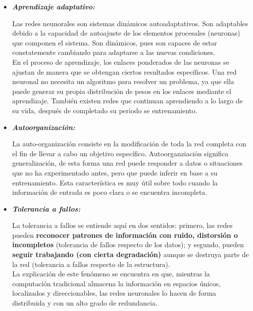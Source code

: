 \documentclass[journal]{IEEEtran}
\begin{document}
\begin{itemize}
\item \textbf{\emph{Aprendizaje adaptativo:}}
        
Las redes neunorales son sistemas dinámicos autoadaptativos. Son adaptables debido a la capacidad de autoajuste de los elementos procesales (neuronas) que componen el sistema. Son dinámicos, pues son capaces de estar constatemente cambiando para adaptarse a las nuevas condiciones.\\

En el proceso de aprendizaje, los enlaces ponderados de las neuronas se ajustan de manera que se obtengan ciertos resultados específicos. Una red neuronal no necesita un algoritmo para resolver un problema, ya que ella puede generar su propia distribución de pesos en los enlaces mediante el aprendizaje. También existen redes que continuan aprendiendo a lo largo de su vida, después de completado su periodo se entrenamiento.\\
        
\item \textbf{\emph{Autoorganización:}}
        
La auto-organización consiste en la modificación de toda la red completa con el fin de llevar a cabo un objetivo específico. Autoorganziación significa generalización, de esta forma una red puede responder a datos o situaciones que no ha experimentado antes, pero que puede inferir en base a su entrenamiento. Esta característica es muy útil sobre todo cuando la información de entrada es poco clara o se encuentra incompleta.\\
        
\item \textbf{\emph{Tolerancia a fallos:}}
        
La tolerancia a fallos se entiende aquí en dos sentidos: primero, las redes pueden \textbf{reconocer patrones de información con ruido, distorsión o incompletos} (tolerancia de fallos respecto de los datos); y segundo, pueden \textbf{seguir trabajando (con cierta degradación)} aunque se destruya parte de la red (tolerancia a fallos respecto de la estructura).\\
 
La explicación de este fenómeno se encuentra en que, mientras la computación tradicional almacena la información en espacios únicos, localizados y direccionables, las redes neuronales lo hacen de forma distribuida y con un alto grado de redundancia.\\
        

\end{itemize}
\end{document}
